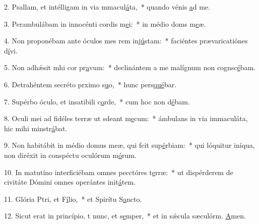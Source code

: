 2. Psallam, et intélligam in via mmacul\uline{á}ta,~* quando vénis \uline{a}d me.\par 
3. Perambulábam in innocénti cordis m\uline{e}i:~* in médio doms m\uline{e}æ.\par 
4. Non proponébam ante óculos mes rem inj\uline{ú}stam:~* faciéntes prævaricatiónes d\uline{í}vi.\par 
5. Non adhǽsit mhi cor pr\uline{a}vum:~* declinántem a me malígnum non cognsc\uline{é}bam.\par 
6. Detrahéntem secréto prximo s\uline{u}o,~* hunc pers\uline{qué}bar.\par 
7. Supérbo óculo, et insatibili c\uline{o}rde,~* cum hoc non d\uline{é}bam.\par 
8. Oculi mei ad fidéles terræ ut sdeant m\uline{e}cum:~* ámbulans in via immaculáta, hic mihi minstr\uline{á}bat.\par 
9. Non habitábit in médio domus meæ, qui fcit sup\uline{é}rbiam:~* qui lóquitur iníqua, non diréxit in conspéctu oculórum m\uline{ó}rum.\par 
10. In matutíno interficiébam omnes pecctóres t\uline{e}rræ:~* ut dispérderem de civitáte Dómini omnes operántes init\uline{á}tem.\par 
11. Glória Ptri, et F\uline{í}lio,~* et Spirítu S\uline{a}ncto.\par 
12. Sicut erat in princípio, t nunc, et s\uline{e}mper,~* et in sǽcula sæculórm. \uline{A}men.\par 
